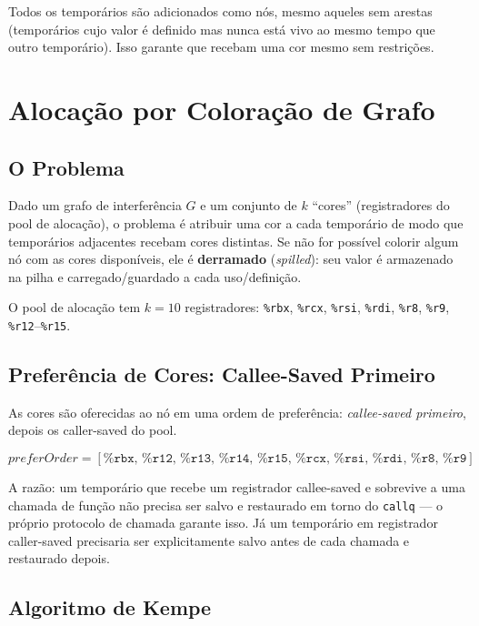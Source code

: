 Todos os temporários são adicionados como nós, mesmo aqueles sem arestas
(temporários cujo valor é definido mas nunca está vivo ao mesmo tempo que
outro temporário). Isso garante que recebam uma cor mesmo sem restrições.

\section{Alocação por Coloração de Grafo}

\subsection{O Problema}

Dado um grafo de interferência $G$ e um conjunto de $k$ ``cores''
(registradores do pool de alocação), o problema é atribuir uma cor a
cada temporário de modo que temporários adjacentes recebam cores
distintas. Se não for possível colorir algum nó com as cores
disponíveis, ele é \textbf{derramado} (\textit{spilled}): seu valor é
armazenado na pilha e carregado/guardado a cada uso/definição.

O pool de alocação tem $k = 10$ registradores:
\texttt{\%rbx}, \texttt{\%rcx}, \texttt{\%rsi}, \texttt{\%rdi},
\texttt{\%r8}, \texttt{\%r9}, \texttt{\%r12}–\texttt{\%r15}.

\subsection{Preferência de Cores: Callee-Saved Primeiro}

As cores são oferecidas ao nó em uma ordem de preferência:
\emph{callee-saved primeiro}, depois os caller-saved do pool.

\[
  \mathit{preferOrder} = [\texttt{\%rbx},\, \texttt{\%r12},\, \texttt{\%r13},\,
    \texttt{\%r14},\, \texttt{\%r15},\, \texttt{\%rcx},\, \texttt{\%rsi},\,
  \texttt{\%rdi},\, \texttt{\%r8},\, \texttt{\%r9}]
\]

A razão: um temporário que recebe um registrador callee-saved e sobrevive
a uma chamada de função não precisa ser salvo e restaurado em torno do
\texttt{callq} — o próprio protocolo de chamada garante isso. Já um
temporário em registrador caller-saved precisaria ser explicitamente salvo
antes de cada chamada e restaurado depois.

\subsection{Algoritmo de Kempe}

